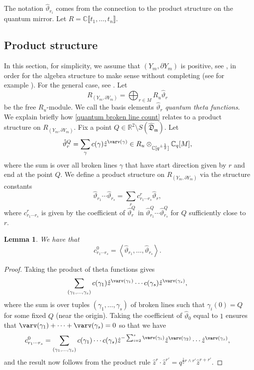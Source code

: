 \documentclass[11pt]{amsart}
\numberwithin{equation}{section}
\theoremstyle{plain}
\newtheorem{lemma}[theorem]{Lemma}
\theoremstyle{remark}
\theoremstyle{definition}
\newcommand\fD{\mathfrak D}
\newcommand\fm{\mathfrak m}
\newcommand{\CC}{\mathbb{C}}
\newcommand{\RR}{\mathbb{R}}
\begin{document}
The notation $\hat{\vartheta}_{r_i}$ comes from the connection to the product structure on the quantum mirror. Let $R = \CC\llbracket t_1,\dots, t_n \rrbracket$. 
\subsection{Product structure}\label{Subsection : product structure}

In this section, for simplicity, we assume that $(Y_m,\partial Y_m)$ is positive, see \cite[Definition 6.10]{gross2015mirror}, in order for the algebra structure to make sense without completing (see for example \cite[Proof of Corollary 4.7]{mandel2021theta}). For the general case, see \cite{bousseau2020quantum}. Let
$$R_{(Y_m,\partial Y_m)} = \bigoplus_{r \in M}R_u\hat{\vartheta}_r$$
be the free $R_u$-module. We call the basis elements $\hat{\vartheta}_r$ \emph{quantum theta functions}. 
We explain briefly how \eqref{quantum broken line count} relates to a product structure on $R_{(Y_m,\partial Y_m)}$. 
Fix a point $Q \in \RR^2 \setminus S(\hat{\fD}_{\fm})$. Let
$$\hat{\vartheta}_{r}^{Q} = \sum_{\gamma} c(\gamma) \hat{z}^{\varv(\gamma)} \in R_u \otimes_{\CC[q^{\pm \frac{1}{2}}]} \CC_q[M],$$
where the sum is over all broken lines $\gamma$ that have start direction given by $r$ and end at the point $Q$. We define a product structure on $R_{(Y_m,\partial Y_m)}$ via the structure constants
$$\hat{\vartheta}_{r_1}\cdots\hat{\vartheta}_{r_s} = \sum_{r}c^{r}_{r_1 \cdots r_s} \hat{\vartheta}_r,$$
where $c^{r}_{r_1 \cdots r_s}$ is given by the coefficient of $\hat{\vartheta}_{r}^Q$ in $\hat{\vartheta}^Q_{r_1}\cdots\hat{\vartheta}^Q_{r_s}$ for $Q$ sufficiently close to $r$.

\begin{lemma}\label{Lemma : structureconstant}
  We have that 
    $$c^0_{r_1 \cdots r_s} = \left\langle \hat{\vartheta}_{r_1},\dots, \hat{\vartheta}_{r_s}\right\rangle.$$
\end{lemma}

\begin{proof}
  Taking the product of theta functions gives
  $$\sum_{(\gamma_1,\ldots,\gamma_s)} c(\gamma_1) \hat{z}^{\varv(\gamma_1)} \cdots c(\gamma_s)\hat{z}^{\varv(\gamma_s)},$$
  where the sum is over tuples $(\gamma_1,\dots,\gamma_s)$  of broken lines such that $\gamma_i(0) = Q$ for some fixed $Q$ (near the origin). Taking the coefficient of $\hat{\vartheta}_0$ equal to $1$ ensures that $\varv(\gamma_1) + \dots + \varv(\gamma_s) = 0$ so that we have 
  $$c^0_{r_1 \cdots r_s} = \sum_{(\gamma_1,\ldots,\gamma_s)} c(\gamma_1)  \cdots c(\gamma_s)\hat{z}^{-\sum_{i=2}^{s}\varv(\gamma_i)}\hat{z}^{\varv(\gamma_2)}\cdots\hat{z}^{\varv(\gamma_s)},$$
  and the result now follows from the product rule $\hat{z}^{r} \cdot \hat{z}^{r'} = q^{\frac{1}{2}r \wedge r'}\hat{z}^{r+r'}$.
\end{proof}
 
\end{document}
